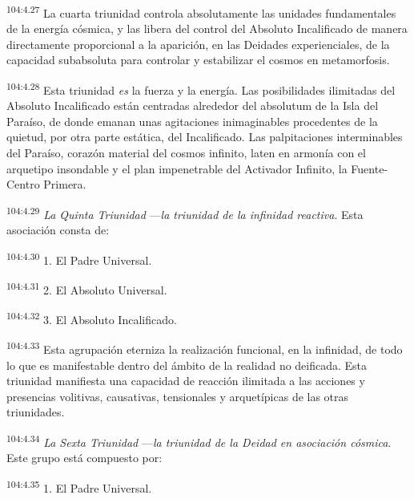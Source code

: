 \documentclass[twoside, 11pt]{book}
\begin{document}
\par
\textsuperscript{104:4.27} La cuarta triunidad controla absolutamente las unidades fundamentales de la energía cósmica, y las libera del control del Absoluto Incalificado de manera directamente proporcional a la aparición, en las Deidades experienciales, de la capacidad subabsoluta para controlar y estabilizar el cosmos en metamorfosis.

\par
\textsuperscript{104:4.28} Esta triunidad \textit{es} la fuerza y la energía. Las posibilidades ilimitadas del Absoluto Incalificado están centradas alrededor del absolutum de la Isla del Paraíso, de donde emanan unas agitaciones inimaginables procedentes de la quietud, por otra parte estática, del Incalificado. Las palpitaciones interminables del Paraíso, corazón material del cosmos infinito, laten en armonía con el arquetipo insondable y el plan impenetrable del Activador Infinito, la Fuente-Centro Primera.

\par
\textsuperscript{104:4.29} \textit{La Quinta Triunidad} ---\textit{la triunidad de la infinidad reactiva}. Esta asociación consta de:

\par
\textsuperscript{104:4.30} 1. El Padre Universal.

\par
\textsuperscript{104:4.31} 2. El Absoluto Universal.

\par
\textsuperscript{104:4.32} 3. El Absoluto Incalificado.

\par
\textsuperscript{104:4.33} Esta agrupación eterniza la realización funcional, en la infinidad, de todo lo que es manifestable dentro del ámbito de la realidad no deificada. Esta triunidad manifiesta una capacidad de reacción ilimitada a las acciones y presencias volitivas, causativas, tensionales y arquetípicas de las otras triunidades.

\par
\textsuperscript{104:4.34} \textit{La Sexta Triunidad} ---\textit{la triunidad de la Deidad en asociación cósmica}. Este grupo está compuesto por:

\par
\textsuperscript{104:4.35} 1. El Padre Universal.
\end{document}
